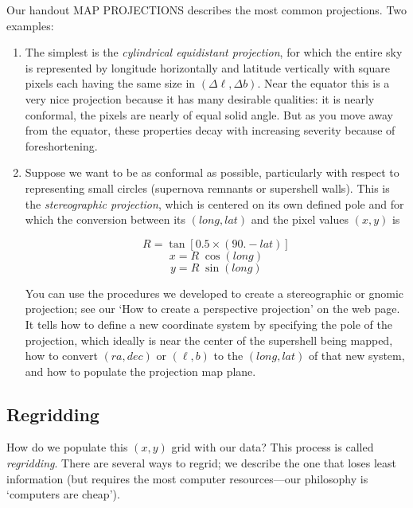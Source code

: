 \documentclass[psfig,preprint]{aastex}
\begin{document}
Our handout MAP PROJECTIONS describes the most common projections. Two
examples:
\begin{enumerate}

\item The simplest is the {\it cylindrical
equidistant projection}, for which the entire sky is represented by
longitude horizontally and latitude vertically with square pixels each
having the same size in $(\Delta \ell, \Delta b)$. Near the equator this
is a very nice projection because it has many desirable qualities: it
is nearly conformal, the pixels are nearly of equal solid angle. But as
you move away from the equator, these properties decay with increasing
severity because of foreshortening.

\item Suppose we want to be as conformal as possible, particularly with
  respect to representing small circles (supernova remnants or
  supershell walls). This is the {\it stereographic projection}, which
  is centered on its own defined pole and for which the conversion
  between its $(long, lat)$ and the pixel values $(x,y)$ is
%
\begin {mathletters}
\begin{equation}
   R = \tan[ 0.5 \times (90.-lat)] 
\end{equation}
\begin{equation}
   x= R \; \cos(long) 
\end{equation}
\begin{equation}
   y= R \; \sin(long) 
\end{equation}
\end {mathletters}
%
You can use the procedures we developed to create a stereographic or
gnomic projection; see our `How to create a perspective projection'
on the web page. It tells how to define a 
new coordinate system by specifying the pole of the projection, which ideally
is near the center of the supershell being mapped, how to convert
$(ra,dec)$ or $(\ell,b)$ to the $(long,lat)$ of that new system, and how
to populate the projection map plane.

\end{enumerate}

\subsection{Regridding}

How do we populate this $(x,y)$ grid
with our data? This process is called {\it regridding}. There are
several ways to regrid; we describe the one that loses least
information (but requires the most computer resources---our
philosophy is `computers are cheap').
\end{document}
